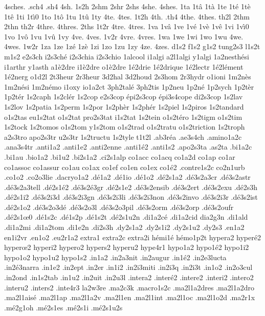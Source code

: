 {4sches.
.sch4
.sh4
4sh.
1s2h
2shm
2shr
2shs
4she.
4shes.
1ta
1t\^a
1t\`a
1te
1t\'e
1t\`e
1t\^e
1ti
1t\^\i0 %
1to
1t\^o
1tu
1t\^u
1ty
4te.
4tes.
1t2h
4th.
.th4
4the.
4thes.
th2l
2thm
2thn
th2r
4thre.
4thres.
2ths
1t2r
4tre.
4tres.
1va
1v\^a
1ve
1v\'e
1v\`e
1v\^e
1vi
1v\^\i0 %
1vo
1v\^o
1vu
1v\^u
1vy
4ve.
4ves.
1v2r
4vre.
4vres.
1wa
1we
1wi
1wo
1wu
4we.
4wes.
1w2r
1za
1ze
1z\'e
1z\`e
1zi
1zo
1zu
1zy
4ze.
4zes.
d1s2
f1s2
g1s2
tung2s3
l1s2t
m1s2
e2s3ch
i2s3ch\'e
i2s3chia
i2s3chio
1alcool
i1algi
a2l1algi
y1algi
1a2nesth\'esi
i1arthr
y1asth
a1\`e2dre
i1\`e2dre
o1\`e2dre
1\'e2drie
1\'e2drique
1\'e2lectr
1\'e2l\'ement
1\'e2nerg
o1d2l
2t3heur
2r3heur
3d2hal
3d2houd
2s3hom
2r3hydr
o1ioni
1m2n\`es
1m2n\'esi
1m2n\'emo
i1oxy
io1a2ct
3ph2tal\'e
3ph2tis
1p2neu
1p2n\'e
1p2sych
1p2t\`er
1p2t\'er
1s2caph
1s2cl\'er
1s2cop
e2s3cop
\'epi2s3cop
\'epi3s4cope
di2s3cop
1s2lav
1s2lov
1s2patia
1s2perm
1s2por
1s2ph\`er
1s2ph\'er
1s2piel
1s2piros
1s2tandard
o1s2tas
eu1s2tat
o1s2tat
pro2s3tat
i1s2tat
1s2tein
o1s2t\'ero
1s2tigm
o1s2tim
1s2tock
1s2tomos
o1s2tom
y1s2tom
o1s2trad
o1s2tratu
o1s2triction
1s2troph
a2s3tro
apo2s3tr
u2s3tr
1s2tructu
1s2tyle
t1t2l
.ab3r\'ea
.ae3s4ch
.amino1a2c
.ana3s4tr
.anti1a2
.anti1e2
.anti2enne
.anti1\'e2
.anti1s2
.apo2s3ta
.as2ta
.bi1a2c
.bi1au
.bio1a2
.bi1u2
.bi2s1a2
.ci2s1alp
co1acc
co1acq
co1a2d
co1ap
co1ar
co1assoc
co1assur
co1au
co1ax
co1ef
co1en
co1ex
co1\'e2
.contre1s2c
co2n1urb
.co1o2
.co2o3lie
.dacryo1a2
.d\'e1a2
.d\'e1io
.d\'e1o2
.d\'e2s1a2
.d\'e3s2a3cr
.d\'e3s2astr
.d\'e3s2a3tell
.d\'e2s1\'e2
.d\'e3s2\'e3gr
.d\'e2s1e2
.d\'e3s2ensib
.d\'e3s2ert
.d\'e3s2exu
.d\'e2s3h
.d\'e2s1i2
.d\'e3s2i3d
.d\'e3s2i3gn
.d\'e3s2i3li
.d\'e3s2i3non
.d\'e3s2invo
.d\'e3s2i3r
.d\'e3s2ist
.d\'e2s1o2
.d\'e3s2o3d\'e
.d\'e3s2o3l
.d\'e3s2o3pil
.d\'e3s2orm
.d\'e3s2orp
.d\'e3s2oufr
.d\'e2s1\oe0  %
.d\'e1s2c
.d\'e1s2p
.d\'e1s2t
.d\'e2s1u2n
.di1a2c\'e
.di1a2cid
dia2g3n
.di1ald
.di1a2mi
.di1a2tom
.di1e2n
.di2s3h
.dy2s1a2
.dy2s1i2
.dy2s1u2
.dy2s3
.en1a2
en1i2vr
.en1o2	
.eu2r1a2
extra1
extra2c
extra2i
h\'emi1\'e
h\'emo1p2t
hypera2
hyper\'e2
hyper\oe2
hyperi2
hypero2
hypers2
hyperu2
hype4r1
hypo1a2
hypo1\'e2
hypo1i2
hypo1o2
hypo1u2
hypo1s2
.in1a2
.in2a3nit
.in2augur
.in1\'e2
.in2e3lucta
.in2\'e3narra
.in1e2
.in2ept
.in2er
.in1i2
.in2i3miti
.in2i3q
.in2i3t
.in1o2
.in2o3cul
.in2ond
.in1s2tab
.in1u2
.in2uit
.in2u3l
.intera2
.inter\'e2
.intere2
.interi2
.intero2
.interu2
.inters2
.inte4r3
la2w3re
.ma2c3k
.macro1s2c
.ma2l1a2dres
.ma2l1a2dro
.ma2l1ais\'e
.ma2l1ap
.ma2l1a2v
.ma2l1en
.ma2l1int
.ma2l1oc
.ma2l1o2d
.ma2r1x
.m\'e2g1oh
.m\'e2s1es
.m\'e2s1i
.m\'e2s1u2s
}
